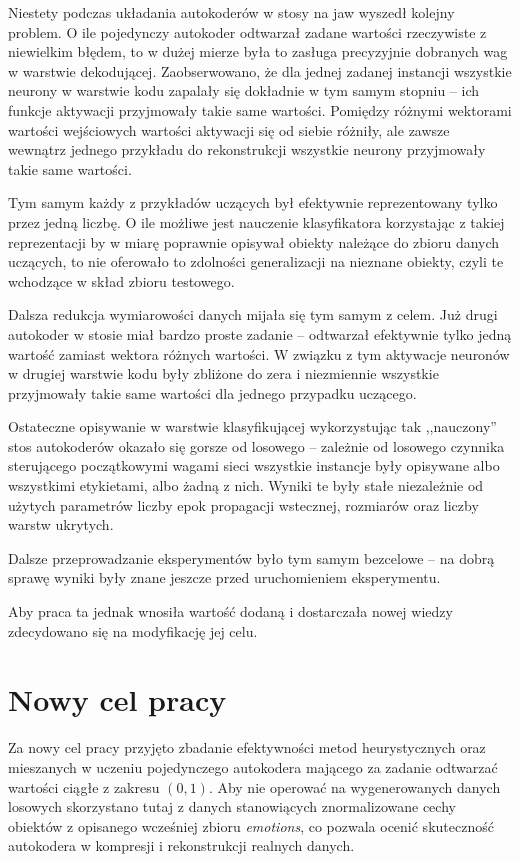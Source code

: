 \documentclass[11pt,a4paper,oneside]{report}
\begin{document}
Niestety podczas układania autokoderów w stosy na jaw wyszedł kolejny problem. O ile pojedynczy autokoder odtwarzał zadane wartości rzeczywiste z niewielkim błędem, to w dużej mierze była to zasługa precyzyjnie dobranych wag w warstwie dekodującej. Zaobserwowano, że dla jednej zadanej instancji wszystkie neurony w warstwie kodu zapalały się dokładnie w tym samym stopniu -- ich funkcje aktywacji przyjmowały takie same wartości. Pomiędzy różnymi wektorami wartości wejściowych wartości aktywacji się od siebie różniły, ale zawsze wewnątrz jednego przykładu do rekonstrukcji wszystkie neurony przyjmowały takie same wartości. 

Tym samym każdy z przykładów uczących był efektywnie reprezentowany tylko przez jedną liczbę. O ile możliwe jest nauczenie klasyfikatora korzystając z takiej reprezentacji by w miarę poprawnie opisywał obiekty należące do zbioru danych uczących, to nie oferowało to zdolności generalizacji na nieznane obiekty, czyli te wchodzące w skład zbioru testowego.

Dalsza redukcja wymiarowości danych mijała się tym samym z celem. Już drugi autokoder w stosie miał bardzo proste zadanie -- odtwarzał efektywnie tylko jedną wartość zamiast wektora różnych wartości. W związku z tym aktywacje neuronów w drugiej warstwie kodu były zbliżone do zera i niezmiennie wszystkie przyjmowały takie same wartości dla jednego przypadku uczącego. 

Ostateczne opisywanie w warstwie klasyfikującej wykorzystując tak ,,nauczony'' stos autokoderów okazało się gorsze od losowego -- zależnie od losowego czynnika sterującego początkowymi wagami sieci wszystkie instancje były opisywane albo wszystkimi etykietami, albo żadną z nich. Wyniki te były stałe niezależnie od użytych parametrów liczby epok propagacji wstecznej, rozmiarów oraz liczby warstw ukrytych. 

Dalsze przeprowadzanie eksperymentów było tym samym bezcelowe -- na dobrą sprawę wyniki były znane jeszcze przed uruchomieniem eksperymentu.

Aby praca ta jednak wnosiła wartość dodaną i dostarczała nowej wiedzy zdecydowano się na modyfikację jej celu.


\section{Nowy cel pracy}

Za nowy cel pracy przyjęto zbadanie efektywności metod heurystycznych oraz mieszanych w uczeniu pojedynczego autokodera mającego za zadanie odtwarzać wartości ciągłe z zakresu $(0, 1)$. Aby nie operować na wygenerowanych danych losowych skorzystano tutaj z danych stanowiących znormalizowane cechy obiektów z opisanego wcześniej zbioru \textit{emotions}, co pozwala ocenić skuteczność autokodera w kompresji i rekonstrukcji realnych danych. 
\end{document}
